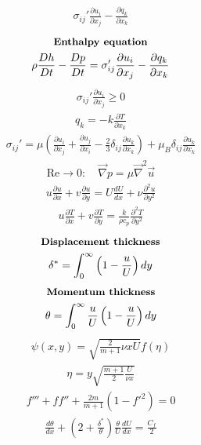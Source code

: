 \documentclass[10pt, a4paper]{article}
\begin{document}
\begin{multicols}{2}
\begin{gather*}
    \sigma_{ij}' \frac{\partial u_i}{\partial x_j}  - \frac{\partial q_k}{\partial x_k}
\end{gather*}
\begin{gather*}
    \textbf{\small Enthalpy equation} \\
    \rho \frac{Dh}{Dt} - \frac{Dp}{Dt} =
    \sigma_{ij}' \frac{\partial u_i}{\partial x_j}  - \frac{\partial q_k}{\partial x_k}
\end{gather*}
\begin{gather*}
    \sigma_{ij}' \frac{\partial u_i}{\partial x_j} \geq 0
\end{gather*}
\begin{gather*}
    q_k = -k\frac{\partial T}{\partial x_k}
\end{gather*}
\begin{gather*}
    \sigma_{ij}' = \mu \left( \frac{\partial u_i}{\partial x_j} + \frac{\partial u_j}{\partial x_i}
    - \frac23\delta_{ij}\frac{\partial u_k}{\partial x_k} \right) + \mu_B\delta_{ij}\frac{\partial u_k}{\partial x_k}
\end{gather*}
\begin{gather*}
    \text{Re} \rightarrow 0: \quad \vec{\nabla}p = \mu \vec{\nabla}^2 \vec{u}
\end{gather*}
\begin{gather*}
    u\frac{\partial u}{\partial x} + v \frac{\partial u}{\partial y} =
    U \frac{dU}{dx} + \nu \frac{\partial^2 u}{\partial y^2}
\end{gather*}
\begin{gather*}
    u\frac{\partial T}{\partial x} + v \frac{\partial T}{\partial y} =
    \frac{k}{\rho c_p} \frac{\partial^2 T}{\partial y^2}
\end{gather*}
\begin{gather*}
    \textbf{\small Displacement thickness} \\
    \delta^* = \int_0^\infty\left( 1 - \frac{u}{U} \right)dy
\end{gather*}
\begin{gather*}
    \textbf{\small Momentum thickness} \\
    \theta = \int_0^\infty \frac{u}{U}\left( 1 - \frac{u}{U} \right)dy
\end{gather*}
\begin{gather*}
    \psi(x,y) = \sqrt{\frac{2}{m+1}\nu x U}f(\eta)
\end{gather*}
\begin{gather*}
    \eta = y \sqrt{\frac{m+1}{2}\frac{U}{\nu x}}
\end{gather*}
\begin{gather*}
    f''' + ff'' + \frac{2m}{m+1}(1-f'^2)=0
\end{gather*}
\begin{gather*}
    \frac{d\theta}{dx} + \left( 2 + \frac{\delta^*}{\theta} \right)\frac{\theta}{U}\frac{dU}{dx} =
    \frac{C_f}{2}
\end{gather*}
\newpage
\end{multicols}
\end{document}
